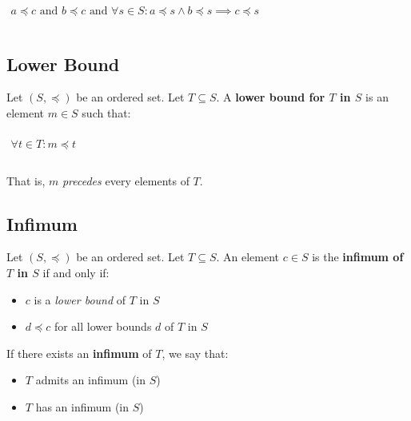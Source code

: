 \begin{math}
  \begin{array}{c}
    \\
    a \preceq c\text{ and }b \preceq c\text{ and }\forall s \in S: a \preceq s \land b \preceq s \implies c \preceq s\\
    \\
  \end{array}
\end{math}



\subsection{Lower Bound}
\label{sec:lower-bound}

Let $(S, \preceq)$ be an ordered set. Let $T \subseteq S$. A
\textbf{lower bound for $T$ in $S$} is an element $m \in S$ such that:

\begin{math}
  \begin{array}{c}
    \\
    \forall t \in T: m \preceq t\\
    \\
  \end{array}
\end{math}

That is, $m$ \textit{precedes} every elements of $T$.


\subsection{Infimum}
\label{sec:infimum}

Let $(S, \preceq)$ be an ordered set. Let $T \subseteq S$. An element
$c \in S$ is the \textbf{infimum of $T$ in $S$} if and only if:

\begin{itemize}
\item $c$ is a \textit{lower bound} of $T$ in $S$
\item $d \preceq c$ for all lower bounds $d$ of $T$ in $S$
\end{itemize}

If there exists an \textbf{infimum} of $T$, we say that:

\begin{itemize}
\item $T$ admits an infimum (in $S$)
\item $T$ has an infimum (in $S$)
\end{itemize}



